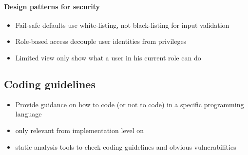 \documentclass[12pt,titlepage,a4paper]{report}
\begin{document}
			\paragraph{Design patterns for security}
			\begin{itemize}
				\item Fail-safe defaults
					\subitem use white-listing, not black-listing for input validation
				\item Role-based access
					\subitem decouple user identities from privileges
				\item Limited view
					\subitem only show what a user in his current role can do
			\end{itemize}

			\subsection{Coding guidelines}
			\begin{itemize}
				\item[\textrightarrow] Provide guidance on how to code (or not to code) in a specific programming language
				\item only relevant from implementation level on
				\item static analysis tools to check coding guidelines and obvious vulnerabilities
			\end{itemize}
\end{document}
